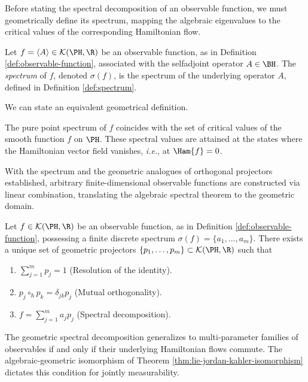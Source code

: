 Before stating the spectral decomposition of an observable function, we must geometrically define its spectrum, mapping the algebraic eigenvalues to the critical values of the corresponding Hamiltonian flow.

\begin{definition}
	\label{def:observable-spectrum}
	Let $f = \langle A \rangle \in \mathcal{K}(\PH,\R)$ be an observable function, as in Definition \ref{def:observable-function}, associated with the selfadjoint operator $A \in \BH$. The \emph{spectrum} of $f$, denoted $\sigma(f)$, is the spectrum of the underlying operator $A$, defined in Definition \ref{def:spectrum}. 
\end{definition}

\noindent We can state an equivalent geometrical definition. 

\begin{remark}
	The pure point spectrum of $f$ coincides with the set of critical values of the smooth function $f$ on $\PH$. These spectral values are attained at the states where the Hamiltonian vector field vanishes, \textit{i.e.}, at $\Ham{f} = 0$. 
\end{remark}

With the spectrum and the geometric analogues of orthogonal projectors established, arbitrary finite-dimensional observable functions are constructed via linear combination, translating the algebraic spectral theorem to the geometric domain.

\begin{theorem}
	\label{thm:geometric-spectral}
	Let $f \in \mathcal{K}(\PH, \R)$ be an observable function, as in Definition \ref{def:observable-function}, possessing a finite discrete spectrum $\sigma(f) = \{a_1, \dots, a_m\}$. There exists a unique set of geometric projectors $\{p_1, \dots, p_m\} \subset \mathcal{K}(\PH, \R)$ such that
	\begin{enumerate}[label=(\roman*)]
		\item $\sum_{j=1}^m p_j = 1$ (Resolution of the identity).
		\item $p_j \circ_{\hbar} p_k = \delta_{jk} p_j$ (Mutual orthogonality).
		\item $f = \sum_{j=1}^m a_j p_j$ (Spectral decomposition).
	\end{enumerate}
\end{theorem}

The geometric spectral decomposition generalizes to multi-parameter families of observables if and only if their underlying Hamiltonian flows commute. The algebraic-geometric isomorphism of Theorem \ref{thm:lie-jordan-kahler-isomorphism} dictates this condition for jointly measurability.

